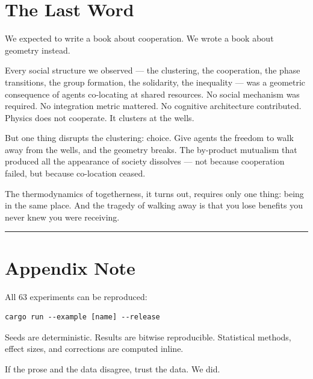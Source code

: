 \section{The Last Word}\label{the-last-word}

We expected to write a book about cooperation. We wrote a book about geometry instead.

Every social structure we observed --- the clustering, the cooperation, the phase transitions, the group formation, the solidarity, the inequality --- was a geometric consequence of agents co-locating at shared resources. No social mechanism was required. No integration metric mattered. No cognitive architecture contributed. Physics does not cooperate. It clusters at the wells.

But one thing disrupts the clustering: choice. Give agents the freedom to walk away from the wells, and the geometry breaks. The by-product mutualism that produced all the appearance of society dissolves --- not because cooperation failed, but because co-location ceased.

The thermodynamics of togetherness, it turns out, requires only one thing: being in the same place. And the tragedy of walking away is that you lose benefits you never knew you were receiving.

\begin{center}\rule{0.5\linewidth}{0.5pt}\end{center}

\section{Appendix Note}\label{appendix-note}

All 63 experiments can be reproduced:

\begin{verbatim}
cargo run --example [name] --release
\end{verbatim}

Seeds are deterministic. Results are bitwise reproducible. Statistical methods, effect sizes, and corrections are computed inline.

If the prose and the data disagree, trust the data. We did.
